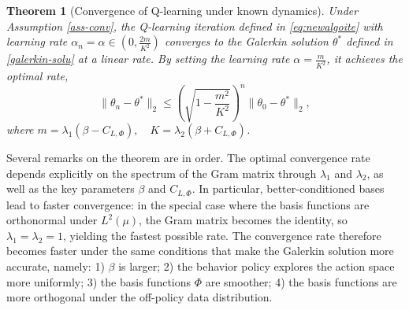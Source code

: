 \documentclass[12pt]{article}
\newtheorem{theorem}{Theorem}[section]
\begin{document}
\begin{theorem}[Convergence of Q-learning under known dynamics]
\label{thm:galerkin_convergence}
Under Assumption \ref{ass-conv}, the Q-learning iteration defined in
\eqref{eq:newalgoite} with learning rate $\alpha_n = \alpha \in (0, \frac{2m}{K^2})$
converges to the Galerkin solution $\theta^*$ defined in \eqref{galerkin-solu}
at a linear rate. By setting the learning rate
$\alpha = \frac{m}{K^2}$, it achieves the optimal rate,
\[
\|\theta_n - \theta^*\|_2 \leq \left(\sqrt{1 - \frac{m^2}{K^2}}\right)^n \|\theta_0 - \theta^*\|_2,
\]
where $m = \lambda_1(\beta - C_{L,\Phi}), \quad K = \lambda_2(\beta + C_{L,\Phi})$.
\end{theorem}



Several remarks on the theorem are in order. The optimal convergence rate
depends explicitly on the spectrum of the Gram matrix through $\lambda_1$
and $\lambda_2$, as well as the key parameters $\beta$ and $C_{L,\Phi}$.
In particular, better-conditioned bases lead to faster convergence: in the
special case where the basis functions are orthonormal under $L^2(\mu)$,
the Gram matrix becomes the identity, so $\lambda_1 = \lambda_2 = 1$,
yielding the fastest possible rate. The convergence rate therefore becomes
faster under the same conditions that make the Galerkin solution more
accurate, namely: 1) $\beta$ is larger; 2) the behavior policy explores the
action space more uniformly; 3) the basis functions $\Phi$ are smoother;
4) the basis functions are more orthogonal under the off-policy data
distribution.





\def\mH{\mathcal{H}}
\end{document}
